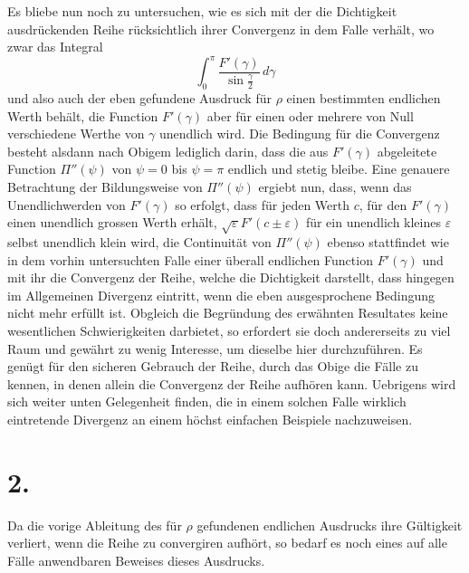 \documentclass[11pt]{article}
\newcommand{\dd}{\,d}
\begin{document}
Es bliebe nun noch zu untersuchen, wie es sich mit der die Dichtigkeit ausdrückenden Reihe rücksichtlich ihrer Convergenz in dem Falle verhält, wo zwar das Integral
\[
 \int_0^\pi \frac{F'(\gamma)}{\sin\frac{\gamma}{2}}\dd\gamma
\]
und also auch der eben gefundene Ausdruck für $\rho$ einen bestimmten endlichen Werth behält, die Function $F'(\gamma)$ aber für einen oder mehrere von Null verschiedene Werthe von $\gamma$ unendlich wird. Die Bedingung für die Convergenz besteht alsdann nach Obigem lediglich darin, dass die aus $F'(\gamma)$ abgeleitete Function $\Pi''(\psi)$ von $\psi=0$ bis $\psi=\pi$ endlich und stetig bleibe. Eine genauere Betrachtung der Bildungsweise von $\Pi''(\psi)$ ergiebt nun, dass, wenn das Unendlichwerden von $F'(\gamma)$ so erfolgt, dass für jeden Werth $c$, für den $F'(\gamma)$ einen unendlich grossen Werth erhält, $\sqrt{\varepsilon}F'(c\pm\varepsilon)$ für ein unendlich kleines $\varepsilon$ selbst unendlich klein wird, die Continuität von $\Pi''(\psi)$ ebenso stattfindet wie in dem vorhin untersuchten Falle einer überall endlichen Function $F'(\gamma)$ und mit ihr die Convergenz der Reihe, welche die Dichtigkeit darstellt, dass hingegen im Allgemeinen Divergenz eintritt, wenn die eben ausgesprochene Bedingung nicht mehr erfüllt ist. Obgleich die Begründung des erwähnten Resultates keine wesentlichen Schwierigkeiten darbietet, so erfordert sie doch andererseits zu viel Raum und gewährt zu wenig Interesse, um dieselbe hier durchzuführen. Es genügt für den sicheren Gebrauch der Reihe, durch das Obige die Fälle zu kennen, in denen allein die Convergenz der Reihe aufhören kann. Uebrigens wird sich weiter unten Gelegenheit finden, die in einem solchen Falle wirklich eintretende Divergenz an einem höchst einfachen Beispiele nachzuweisen.

\section*{2.}

Da die vorige Ableitung des für $\rho$ gefundenen endlichen Ausdrucks ihre Gültigkeit verliert, wenn die Reihe zu convergiren aufhört, so bedarf es noch eines auf alle Fälle anwendbaren Beweises dieses Ausdrucks.
\end{document}
